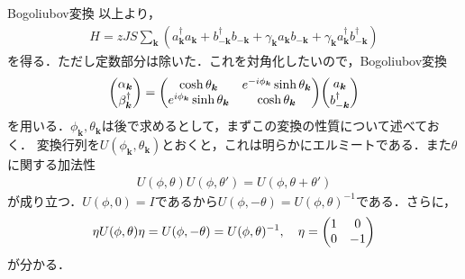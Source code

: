 \documentclass[\main/main.tex]{subfiles}
\begin{document}
\begin{frame}{Bogoliubov変換}
    以上より，
    \begin{align}
        H = zJS \sum_{\bm{k}}(a_{\bm{k}}^\dagger a_{\bm{k}} + b_{-\bm{k}}^\dagger b_{-\bm{k}} + \gamma_{\bm{k}} a_{\bm{k}} b_{-\bm{k}} + \gamma_{\bm{k}} a_{\bm{k}}^\dagger b_{-\bm{k}}^\dagger)
    \end{align}
    を得る．ただし定数部分は除いた．これを対角化したいので，Bogoliubov変換
    \begin{align}
        \mqty(\alpha_{\bm{k}}\\ \beta_{\bm{k}}^\dagger) =
        \mqty(
            \cosh \theta_{\bm{k}} & e^{-i\phi_{\bm{k}}}\sinh \theta_{\bm{k}} \\
            e^{i\phi_{\bm{k}}}\sinh\theta_{\bm{k}} & \cosh \theta_{\bm{k}}
        )
        \mqty(a_{\bm{k}}\\b_{-\bm{k}}^\dagger)
        \label{HP method: Bogoliubov transformation}
    \end{align}
    を用いる．$\phi_{\bm{k}},\theta_{\bm{k}}$は後で求めるとして，まずこの変換の性質について述べておく．
    変換行列を$U(\phi_{\bm{k}},\theta_{\bm{k}})$とおくと，これは明らかにエルミートである．また$\theta$に関する加法性
    \begin{align}
        U(\phi,\theta)U(\phi,\theta') = U(\phi,\theta + \theta')
    \end{align}
    が成り立つ．$U(\phi,0) = I$であるから$U(\phi,-\theta) = U(\phi,\theta)^{-1}$である．さらに，
    \begin{align}
        \eta U(\phi,\theta) \eta = U(\phi,-\theta) = U(\phi,\theta)^{-1}, \quad \eta = \mqty(1&0\\0&-1)
    \end{align}
    が分かる．
\end{frame}
\end{document}
